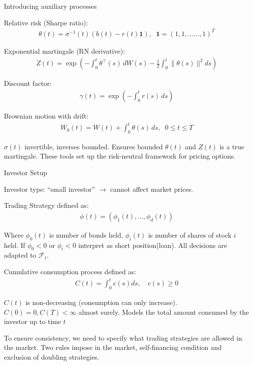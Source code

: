 \documentclass{beamer}
\begin{document}
\begin{frame}{Introducing auxiliary processes}

    {\footnotesize \footnotesize
    \par Relative risk (Sharpe ratio): 
    \begin{align*}
            \theta(t) = \sigma^{-1}(t)\left(b(t) - r(t)\mathbf{1}\right),\;\; \mathbf{1} = (1,1,......,1)^T
    \end{align*}
    \par Exponential martingale (RN derivative): 
    \begin{align*}
        Z(t) = \exp\left(-\int_{0}^{t}\theta^{\top}(s)\,dW(s) - \frac{1}{2}\int_{0}^{t}\|\theta(s)\|^{2}ds\right)
    \end{align*}
    \par Discount factor:
    \begin{align*}
        \gamma(t) = \exp\left(-\int_{0}^{t}r(s)\,ds\right)
    \end{align*}
    \par Brownian motion with drift:
    \begin{align*}
         W_0(t) = W(t) + \int_{0}^{t}\theta(s)\,ds,\;\; 0\leq t\leq T
    \end{align*}
    \par $\sigma(t)$ invertible, inverses bounded. Ensures bounded $\theta(t)$ and $Z(t)$ is a true martingale.
    These tools set up the risk-neutral framework for pricing options.

    }   
\end{frame}
\begin{frame}{Investor Setup}

    {\footnotesize \footnotesize
    \par  Investor type: ``small investor'' $\rightarrow$ cannot affect market prices.
    \par Trading Strategy defined as:
    \begin{align*}
         \phi(t) = (\phi_1(t), \ldots, \phi_d(t)) 
    \end{align*}
    \par Where $\phi_0(t)$ is number of bonds held,
     $\phi_i(t)$ is number of shares of stock $i$ held. 
     If  $\phi_0 < 0$ or $\phi_i < 0$ interpret as short position(loan). All decisions are adapted to $\mathcal{F}_t$.
    \par Cumulative consumption process defined as:
    \begin{align*}
         C(t) = \int_0^t c(s)  ds, \quad c(s) \geq 0
    \end{align*}
    \par $C(t)$ is non-decreasing (consumption can only increase).  $C(0) = 0,  C(T) < \infty$ almost surely. 
    Models the total amount consumed by the investor up to time $t$
    \vspace{1em}
    \par To ensure consistency, we need to specify what trading strategies are allowed in the market. Two rules impose in the market, 
    self-financing condition and exclusion of doubling strategies.
    }   
\end{frame}
\end{document}
